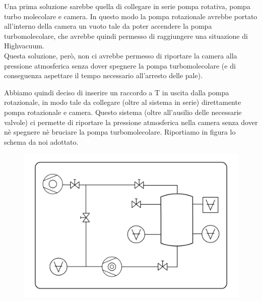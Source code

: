 \documentclass[11pt]{article}
\begin{document}
 \hspace*{0.1mm}Una prima soluzione sarebbe quella di collegare in serie pompa rotativa, pompa turbo molecolare e camera. In questo modo la pompa rotazionale avrebbe portato all'interno della camera un vuoto tale da poter accendere la pompa turbomolecolare, che avrebbe quindi permesso di raggiungere una situazione di Highvacuum. 
\\Questa soluzione, però, non ci avrebbe permesso di riportare la camera alla pressione atmosferica senza dover spegnere la pompa turbomolecolare (e di conseguenza aspettare il tempo necessario all'arresto delle pale).
  
 
 \hspace*{0.1mm}Abbiamo quindi deciso di inserire un raccordo a T in uscita dalla pompa rotazionale, in modo tale da collegare (oltre al sistema in serie) direttamente pompa rotazionale e camera. Questo sistema (oltre all'ausilio delle necessarie valvole) ci permette di riportare la pressione atmosferica nella camera senza dover nè spegnere nè bruciare la pompa turbomolecolare. Riportiamo in figura lo schema da noi adottato.
 \begin{center} 
\begin{figure}[H]
\hspace{-77.5pt}
\includegraphics[scale=0.5]{schema_finale.png}
\caption{}
\label{}
\end{figure}
\end{center}
\end{document}
